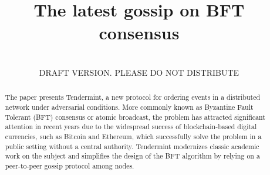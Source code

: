 \documentclass[conference,onecolumn,draft,a4paper]{IEEEtran}
\begin{document}
%
\title{The latest gossip on BFT consensus}


\author{
	\\
	DRAFT VERSION. PLEASE DO NOT DISTRIBUTE
}


\maketitle


\begin{abstract}
The paper presents Tendermint, a new protocol for ordering events in a distributed network under adversarial conditions. More commonly known as Byzantine Fault Tolerant (BFT) consensus or atomic broadcast, the problem has attracted significant attention in recent years due to the widespread success of blockchain-based digital currencies, such as Bitcoin and Ethereum, which successfully solve the problem in a public setting without a central authority. Tendermint modernizes classic academic work on the subject and simplifies the design of the BFT algorithm by relying on a peer-to-peer gossip protocol among nodes. 
\end{abstract}












\end{document}
